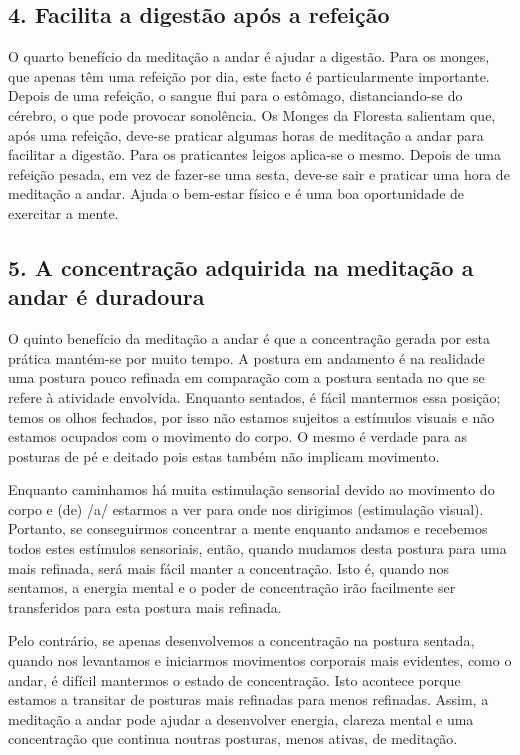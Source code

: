 \subsection{4. Facilita a digestão após a refeição}

O quarto benefício da meditação a andar é ajudar a digestão. Para os
monges, que apenas têm uma refeição por dia, este facto é
particularmente importante. Depois de uma refeição, o sangue flui para o
estômago, distanciando-se do cérebro, o que pode provocar sonolência. Os
Monges da Floresta salientam que, após uma refeição, deve-se praticar
algumas horas de meditação a andar para facilitar a digestão. Para os
praticantes leigos aplica-se o mesmo. Depois de uma refeição pesada, em
vez de fazer-se uma sesta, deve-se sair e praticar uma hora de meditação
a andar. Ajuda o bem-estar físico e é uma boa oportunidade de exercitar
a mente.

\subsection{5. A concentração adquirida na meditação a andar é duradoura}

O quinto benefício da meditação a andar é que a concentração gerada por
esta prática mantém-se por muito tempo. A postura em andamento é na
realidade uma postura pouco refinada em comparação com a postura sentada
no que se refere à atividade envolvida. Enquanto sentados, é fácil
mantermos essa posição; temos os olhos fechados, por isso não estamos
sujeitos a estímulos visuais e não estamos ocupados com o movimento do
corpo. O mesmo é verdade para as posturas de pé e deitado pois estas
também não implicam movimento.

Enquanto caminhamos há muita estimulação sensorial devido ao movimento
do corpo e (de) /a/ estarmos a ver para onde nos dirigimos (estimulação
visual). Portanto, se conseguirmos concentrar a mente enquanto andamos e
recebemos todos estes estímulos sensoriais, então, quando mudamos desta
postura para uma mais refinada, será mais fácil manter a concentração.
Isto é, quando nos sentamos, a energia mental e o poder de concentração
irão facilmente ser transferidos para esta postura mais refinada.

Pelo contrário, se apenas desenvolvemos a concentração na postura
sentada, quando nos levantamos e iniciarmos movimentos corporais mais
evidentes, como o andar, é difícil mantermos o estado de concentração.
Isto acontece porque estamos a transitar de posturas mais refinadas para
menos refinadas. Assim, a meditação a andar pode ajudar a desenvolver
energia, clareza mental e uma concentração que continua noutras
posturas, menos ativas, de meditação.

